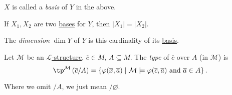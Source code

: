 \begin{notation}[Basis]\label{not:basis}
	\(X\) is called a \emph{basis} of \(Y\) in the above.
\end{notation}

\begin{remark}
	If \(X_1, X_2\) are two \hyperref[not:basis]{bases} for \(Y\), then \(\vert X_1 \vert = \vert X_2 \vert \).
\end{remark}

\begin{notation}[Dimension]\label{def:dimension}
	The \emph{dimension} \(\dim Y\) of \(Y\) is this cardinality of its \hyperref[not:basis]{basis}.
\end{notation}

\begin{definition}[Type]\label{def:type}
	Let \(\mathcal{M} \) be an \hyperref[def:structure]{\(\mathcal{L} \)-structure}, \(\overline{c} \in M\), \(A \subseteq M\). The \emph{type} of \(\overline{c} \) over \(A\) (in \(\mathcal{M} \)) is
	\[
		\tp^{\mathcal{M} }\left( \overline{c} / A \right) = \left\{ \varphi (\overline{x} , \overline{a} ) \mid \mathcal{M} \models \varphi (\overline{c} , \overline{a} ) \text{ and } \overline{a} \in A \right\}.
	\]
\end{definition}

\begin{notation}
	Where we omit \(/ A\), we just mean \(/ \varnothing\).
\end{notation}

